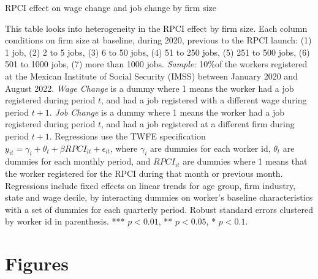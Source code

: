 \documentclass[oneside,11pt]{article}
\begin{document}
\begin{landscape}

\begin{table}[H]
    \caption{RPCI effect on wage change and job change by firm size}
    \label{twfe_change_hetero_firm_size}
    \begin{center}
    \scriptsize{}
    \end{center}
\end{table}
\scriptsize{
\noindent This table looks into heterogeneity in the RPCI effect by firm size. Each column conditions on firm size at baseline, during 2020, previous to the RPCI launch: (1) 1 job, (2) 2 to 5 jobs, (3) 6 to 50 jobs, (4) 51 to 250 jobs, (5) 251 to 500 jobs, (6) 501 to 1000 jobs, (7) more than 1000 jobs. \textit{Sample:} 10\%of the workers registered at the Mexican Institute of Social Security (IMSS) between January 2020 and August 2022. \textit{Wage Change} is a dummy where 1 means the worker had a job registered during period $t$, and had a job registered with a different wage during period $t+1$. \textit{Job Change} is a dummy where 1 means the worker had a job registered during period $t$, and had a job registered at a different firm during period $t+1$. Regressions use the TWFE specification $y_{it} = \gamma_{i} + \theta_{t}+ \beta RPCI_{it} +\epsilon_{it}$, where $\gamma_{i}$ are dummies for each worker id, $\theta_{t}$ are dummies for each monthly period, and $RPCI_{it}$ are dummies where 1 means that the worker registered for the RPCI during that month or previous month. Regressions include fixed effects on linear trends for age group, firm industry, state and wage decile, by interacting dummies on worker's baseline characteristics with a set of dummies for each quarterly period. Robust standard errors clustered by worker id in parenthesis. *** $p<0.01$, ** $p<0.05$, * $p<0.1$.
}

\end{landscape}




\clearpage
\singlespacing

\section{Figures}
\end{document}
